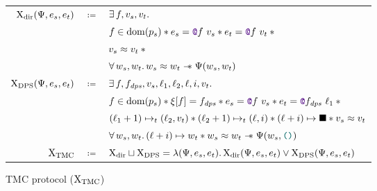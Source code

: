 \begin{figure}[tp]
    \begin{tabular}{rcl}
            $\iProt_\mathrm{dir} (\iPredTwo, \datalangExpr_s, \datalangExpr_t)$
            & $\coloneqq$ &
            $\exists \datalangFn, \datalangVal_s, \datalangVal_t \ldotp$
        \\
            &&
            $\datalangFn \in \dom{\datalangProg_s} \iSep
            \datalangExpr_s = \datalangCall{\datalangFnptr{\datalangFn}}{\datalangVal_s} \iSep
            \datalangExpr_t = \datalangCall{\datalangFnptr{\datalangFn}}{\datalangVal_t} \iSep {}$
        \\
            &&
            $\datalangVal_s \iSimilar \datalangVal_t \iSep {}$
        \\
            &&
            $\forall \datalangValTwo_s, \datalangValTwo_t \ldotp
            \datalangValTwo_s \iSimilar \datalangValTwo_t \iWand
            \iPredTwo (\datalangValTwo_s, \datalangValTwo_t)$
        \\
            $\iProt_\mathrm{DPS} (\iPredTwo, \datalangExpr_s, \datalangExpr_t)$
            & $\coloneqq$ &
            $\exists \datalangFn, \datalangFn_\mathit{dps}, \datalangVal_s, \datalangLoc_1, \datalangLoc_2, \datalangLoc, \datalangIdx, \datalangVal_t \ldotp$
        \\
            &&
            $\datalangFn \in \dom{\datalangProg_s} \iSep
            \datalangRenaming [\datalangFn] = \datalangFn_\mathit{dps} \iSep
            \datalangExpr_s = \datalangCall{\datalangFnptr{\datalangFn}}{\datalangVal_s} \iSep
            \datalangExpr_t = \datalangCall{\datalangFnptr{\datalangFn_\mathit{dps}}}{\datalangLoc_1} \iSep {}$
        \\
            &&
            $(\datalangLoc_1 + 1) \iPointsto_t (\datalangLoc_2, \datalangVal_t) \iSep
            (\datalangLoc_2 + 1) \iPointsto_t (\datalangLoc, \datalangIdx) \iSep
            (\datalangLoc + \datalangIdx) \iPointsto \datalangHole \iSep
            \datalangVal_s \iSimilar \datalangVal_t$
        \\
            &&
            $\forall \datalangValTwo_s, \datalangValTwo_t \ldotp
            (\datalangLoc + \datalangIdx) \iPointsto \datalangValTwo_t \iSep
            \datalangValTwo_s \iSimilar \datalangValTwo_t \iWand
            \iPredTwo (\datalangValTwo_s, \datalangUnit)$
        \\
            $\mathrm{X}_\mathrm{TMC}$
            & $\coloneqq$ &
            $\iProt_\mathrm{dir} \sqcup \iProt_\mathrm{DPS}
            =
            \lambdaAbs (\iPredTwo, \datalangExpr_s, \datalangExpr_t) \ldotp \iProt_\mathrm{dir} (\iPredTwo, \datalangExpr_s, \datalangExpr_t) \iOr \iProt_\mathrm{DPS} (\iPredTwo, \datalangExpr_s, \datalangExpr_t)$
    \end{tabular}
    \caption{TMC protocol ($\mathrm{X}_\mathrm{TMC}$)}
    \label{fig:protocol}
\end{figure}
